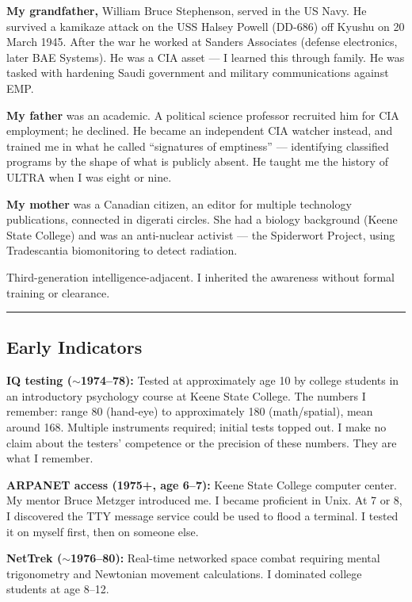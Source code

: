 \textbf{My grandfather,} William Bruce Stephenson, served in the US Navy. He survived a kamikaze attack on the USS Halsey Powell (DD-686) off Kyushu on 20 March 1945. After the war he worked at Sanders Associates (defense electronics, later BAE Systems). He was a CIA asset --- I learned this through family. He was tasked with hardening Saudi government and military communications against EMP.

\textbf{My father} was an academic. A political science professor recruited him for CIA employment; he declined. He became an independent CIA watcher instead, and trained me in what he called ``signatures of emptiness'' --- identifying classified programs by the shape of what is publicly absent. He taught me the history of ULTRA when I was eight or nine.

\textbf{My mother} was a Canadian citizen, an editor for multiple technology publications, connected in digerati circles. She had a biology background (Keene State College) and was an anti-nuclear activist --- the Spiderwort Project, using Tradescantia biomonitoring to detect radiation.

Third-generation intelligence-adjacent. I inherited the awareness without formal training or clearance.

\vspace{1cm}\hrule\vspace{1cm}

\subsection*{Early Indicators}
\label{record:tgt-early-indicators-pre-college}

\textbf{IQ testing ($\sim$1974--78):} Tested at approximately age 10 by college students in an introductory psychology course at Keene State College. The numbers I remember: range 80 (hand-eye) to approximately 180 (math/spatial), mean around 168. Multiple instruments required; initial tests topped out. I make no claim about the testers' competence or the precision of these numbers. They are what I remember.

\textbf{ARPANET access (1975+, age 6--7):} Keene State College computer center. My mentor Bruce Metzger introduced me. I became proficient in Unix. At 7 or 8, I discovered the TTY message service could be used to flood a terminal. I tested it on myself first, then on someone else.

\textbf{NetTrek ($\sim$1976--80):} Real-time networked space combat requiring mental trigonometry and Newtonian movement calculations. I dominated college students at age 8--12.

